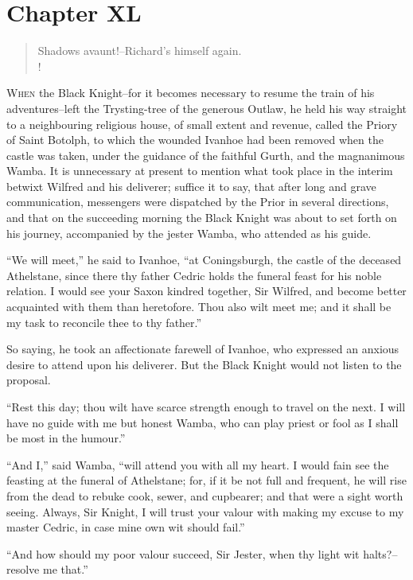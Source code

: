 \chapter{Chapter XL}

\begin{verse}
Shadows avaunt!--Richard's himself again.\\!
\end{verse}

\lettrine{W}{hen} the Black Knight--for it becomes necessary to resume
the train of
his adventures--left the Trysting-tree of the generous Outlaw, he held
his way straight to a neighbouring religious house, of small extent and
revenue, called the Priory of Saint Botolph, to which the wounded
Ivanhoe had been removed when the castle was taken, under the guidance
of the faithful Gurth, and the magnanimous Wamba. It is unnecessary at
present to mention what took place in the interim betwixt Wilfred and
his deliverer; suffice it to say, that after long and grave
communication, messengers were dispatched by the Prior in several
directions, and that on the succeeding morning the Black Knight was
about to set forth on his journey, accompanied by the jester Wamba, who
attended as his guide.

``We will meet,'' he said to Ivanhoe, ``at Coningsburgh, the castle of
the deceased Athelstane, since there thy father Cedric holds the funeral
feast for his noble relation. I would see your Saxon kindred together,
Sir Wilfred, and become better acquainted with them than heretofore.
Thou also wilt meet me; and it shall be my task to reconcile thee to thy
father.''

So saying, he took an affectionate farewell of Ivanhoe, who expressed an
anxious desire to attend upon his deliverer. But the Black Knight would
not listen to the proposal.

``Rest this day; thou wilt have scarce strength enough to travel on the
next. I will have no guide with me but honest Wamba, who can play priest
or fool as I shall be most in the humour.''

``And I,'' said Wamba, ``will attend you with all my heart. I would fain
see the feasting at the funeral of Athelstane; for, if it be not full
and frequent, he will rise from the dead to rebuke cook, sewer, and
cupbearer; and that were a sight worth seeing. Always, Sir Knight, I
will trust your valour with making my excuse to my master Cedric, in
case mine own wit should fail.''

``And how should my poor valour succeed, Sir Jester, when thy light wit
halts?--resolve me that.''

